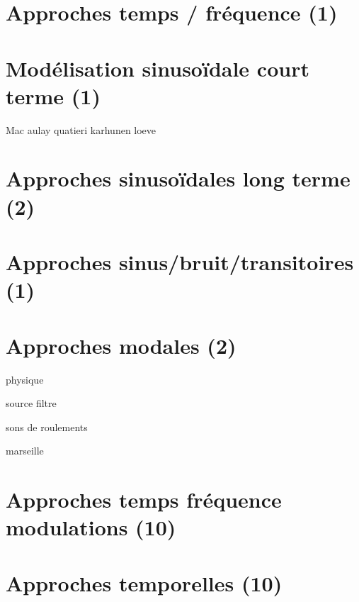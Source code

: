 
\section{Approches temps / fréquence (1)}

\section{Modélisation sinusoïdale court terme (1)}

Mac aulay quatieri
karhunen loeve

\section{Approches sinusoïdales long terme (2)}

\section{Approches sinus/bruit/transitoires (1)}

\section{Approches modales (2)}

physique

source filtre

sons de roulements

marseille

\section{Approches temps fréquence modulations (10)}

\section{Approches temporelles (10)}

